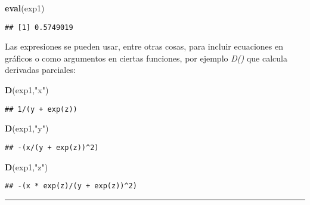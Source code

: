 \documentclass[11pt,]{article}
\newenvironment{Shaded}{\begin{snugshade}}{\end{snugshade}}
\newcommand{\KeywordTok}[1]{\textcolor[rgb]{0.13,0.29,0.53}{\textbf{#1}}}
\newcommand{\NormalTok}[1]{#1}
\newcommand{\StringTok}[1]{\textcolor[rgb]{0.31,0.60,0.02}{#1}}
\begin{document}
\begin{Shaded}
\begin{Highlighting}[]
\KeywordTok{eval}\NormalTok{(exp1)}
\end{Highlighting}
\end{Shaded}

\begin{verbatim}
## [1] 0.5749019
\end{verbatim}

Las expresiones se pueden usar, entre otras cosas, para incluir
ecuaciones en gráficos o como argumentos en ciertas funciones, por
ejemplo \emph{D()} que calcula derivadas parciales:

\begin{Shaded}
\begin{Highlighting}[]
\KeywordTok{D}\NormalTok{(exp1,}\StringTok{"x"}\NormalTok{)}
\end{Highlighting}
\end{Shaded}

\begin{verbatim}
## 1/(y + exp(z))
\end{verbatim}

\begin{Shaded}
\begin{Highlighting}[]
\KeywordTok{D}\NormalTok{(exp1,}\StringTok{"y"}\NormalTok{)}
\end{Highlighting}
\end{Shaded}

\begin{verbatim}
## -(x/(y + exp(z))^2)
\end{verbatim}

\begin{Shaded}
\begin{Highlighting}[]
\KeywordTok{D}\NormalTok{(exp1,}\StringTok{"z"}\NormalTok{)}
\end{Highlighting}
\end{Shaded}

\begin{verbatim}
## -(x * exp(z)/(y + exp(z))^2)
\end{verbatim}

\begin{center}\rule{0.5\linewidth}{0.5pt}\end{center}

\newpage
\singlespacing 
\end{document}
